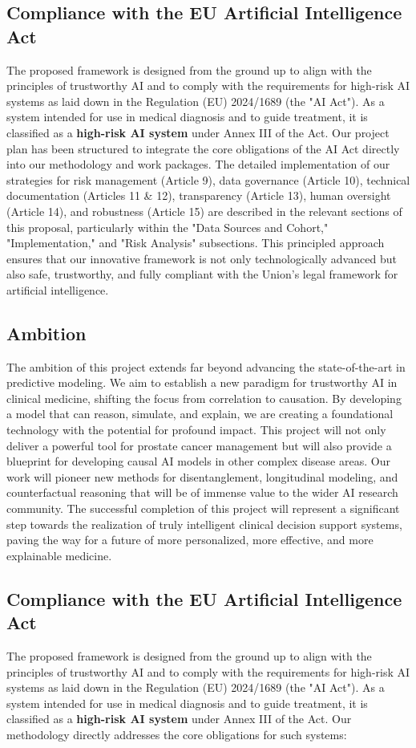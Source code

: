 \documentclass[11pt, a4paper]{article}
\begin{document}
\subsection{Compliance with the EU Artificial Intelligence Act}
The proposed framework is designed from the ground up to align with the principles of trustworthy AI and to comply with the requirements for high-risk AI systems as laid down in the Regulation (EU) 2024/1689 (the "AI Act"). As a system intended for use in medical diagnosis and to guide treatment, it is classified as a \textbf{high-risk AI system} under Annex III of the Act. Our project plan has been structured to integrate the core obligations of the AI Act directly into our methodology and work packages. The detailed implementation of our strategies for risk management (Article 9), data governance (Article 10), technical documentation (Articles 11 \& 12), transparency (Article 13), human oversight (Article 14), and robustness (Article 15) are described in the relevant sections of this proposal, particularly within the "Data Sources and Cohort," "Implementation," and "Risk Analysis" subsections. This principled approach ensures that our innovative framework is not only technologically advanced but also safe, trustworthy, and fully compliant with the Union's legal framework for artificial intelligence.

\subsection{Ambition}
The ambition of this project extends far beyond advancing the state-of-the-art in predictive modeling. We aim to establish a new paradigm for trustworthy AI in clinical medicine, shifting the focus from correlation to causation. By developing a model that can reason, simulate, and explain, we are creating a foundational technology with the potential for profound impact. This project will not only deliver a powerful tool for prostate cancer management but will also provide a blueprint for developing causal AI models in other complex disease areas. Our work will pioneer new methods for disentanglement, longitudinal modeling, and counterfactual reasoning that will be of immense value to the wider AI research community. The successful completion of this project will represent a significant step towards the realization of truly intelligent clinical decision support systems, paving the way for a future of more personalized, more effective, and more explainable medicine.

\subsection{Compliance with the EU Artificial Intelligence Act}
The proposed framework is designed from the ground up to align with the principles of trustworthy AI and to comply with the requirements for high-risk AI systems as laid down in the Regulation (EU) 2024/1689 (the "AI Act"). As a system intended for use in medical diagnosis and to guide treatment, it is classified as a \textbf{high-risk AI system} under Annex III of the Act. Our methodology directly addresses the core obligations for such systems:
\end{document}
